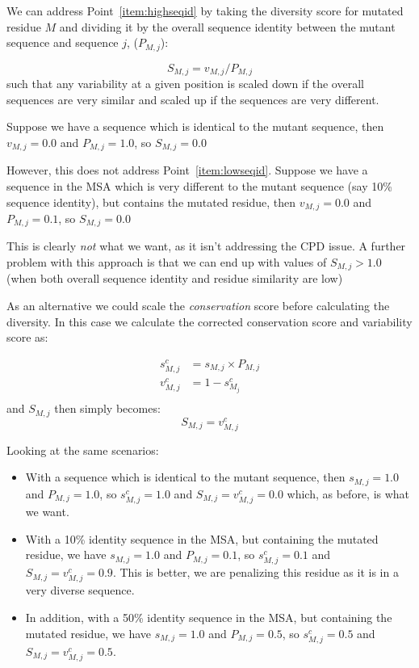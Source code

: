 \documentclass[a4paper]{article}
\begin{document}
We can address Point~\ref{item:highseqid}  by
taking the diversity score for mutated residue $M$ and dividing it by
the overall sequence identity between the mutant sequence and sequence
$j$, ($P_{M, j}$):

\begin{equation}
  S_{M,j} = v_{M, j} / P_{M, j}
\end{equation}
such that any variability at a given position is scaled down if the
overall sequences are very similar and scaled up if the sequences are
very different.

Suppose we have a sequence which is identical to the
mutant sequence, then $v_{M, j} = 0.0$ and $P_{M, j} = 1.0$, so
$S_{M,j} = 0.0$

However, this does not address Point~\ref{item:lowseqid}.
Suppose we have a sequence in the MSA which is very different to the mutant
sequence (say 10\% sequence identity), but contains the mutated
residue, then $v_{M, j} = 0.0$ and $P_{M, j} = 0.1$, so $S_{M,j} =
0.0$

This is clearly \emph{not} what we want, as it isn't addressing the CPD
issue. A further problem with this approach is that we can end up with
values of $S_{M,j} > 1.0$ (when both overall sequence identity and
residue similarity are low)

As an alternative we could scale the \emph{conservation} score before
calculating the diversity. In this case we calculate the corrected
conservation score and variability score as:

\begin{equation}
  \begin{array}{ll}
    s^c_{M,j} & = s_{M,j} \times P_{M, j} \\
    v^c_{M,j} & = 1 - s^c_{M_j} \\
  \end{array}
\end{equation}
and $S_{M,j}$ then simply becomes:
\begin{equation}
  S_{M,j} = v^c_{M, j}
\end{equation}

Looking at the same scenarios:

\begin{itemize}  
\item With a sequence which is identical to the mutant sequence, then
  $s_{M, j} = 1.0$ and $P_{M, j} = 1.0$, so $s^c_{M,j} = 1.0$ and
  $S_{M,j} = v^c_{M,j} = 0.0$ which, as before, is what we want.

\item With a 10\% identity sequence in the MSA, but containing the
  mutated residue, we have $s_{M, j} = 1.0$ and $P_{M, j} = 0.1$, so
  $s^c_{M,j} = 0.1$ and $S_{M,j} = v^c_{M,j} = 0.9$. This is
  better, we are penalizing this residue as it is in a very diverse
  sequence.

\item In addition, with a 50\% identity sequence in the MSA, but
  containing the mutated residue, we have $s_{M, j} = 1.0$ and $P_{M,
    j} = 0.5$, so $s^c_{M,j} = 0.5$ and $S_{M,j} = v^c_{M,j} =
  0.5$.
\end{itemize}  
\end{document}

